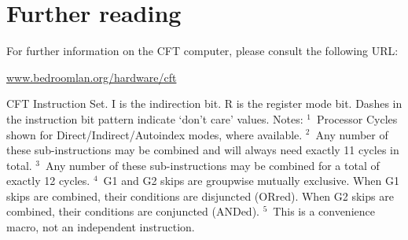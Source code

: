 \documentclass[11pt,a4paper,twocolumns]{article}
\newcommand\link[1]{\sf\href{http://#1}{#1}}
\newcommand\register[1]{\textsf{#1}}
\newcommand\A{\register{AC}}
\newcommand\Lreg{\register{L}}
\newcommand\AR{\register{AR}}
\newcommand\MAR{\AR}
\newcommand\DR{\register{DR}}
\newcommand\PC{\register{PC}}
\newcommand\IR{\register{IR}}
\begin{document}
\section{Further reading}

For further information on the CFT computer, please consult the
following URL:

\begin{center}
\link{www.bedroomlan.org/hardware/cft}
\end{center}


\begin{table}
\newcommand\mk[1]{$^{#1}$}
\newcommand\mka{\mk{1}}
\newcommand\mkb{\mk{2}}
\newcommand\mkc{\mk{3}}
\newcommand\mkd{\mk{4}}
\newcommand\mke{\mk{5}}


\caption{\label{tab-is}CFT Instruction Set. I is the indirection bit. R is the
  register mode bit. Dashes in the instruction bit pattern indicate ‘don't
  care’ values. Notes: \mka~Processor Cycles shown for
  Direct/Indirect/Autoindex modes, where available. \mkb~Any number of these
  sub-instructions may be combined and will always need exactly 11 cycles in
  total. \mkc~Any number of these sub-instructions may be combined for a total
  of exactly 12 cycles. \mkd~G1 and G2 skips are groupwise mutually
  exclusive. When G1 skips are combined, their conditions are disjuncted
  (ORred). When G2 skips are combined, their conditions are conjuncted
  (ANDed). \mke~This is a convenience macro, not an independent instruction.}
\end{table}


\end{document}
